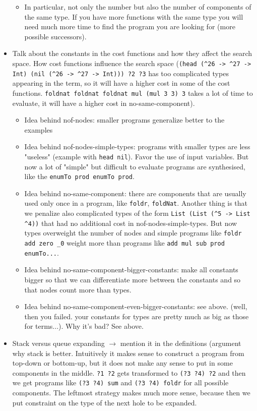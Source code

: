 \begin{itemize}
\begin{itemize}
\item In particular, not only the number but also the number of components of the same type. If you have more functions with the same type you will need much more time to find the program you are looking for (more possible successors).
\end{itemize} 
\item Talk about the constants in the cost functions and how they affect the search space.
How cost functions influence the search space (\lstinline!(head (^26 -> ^27 -> Int) (nil (^26 -> ^27 -> Int))) ?2 ?3! has too complicated types appearing in the term, so it will have a higher cost in some of the cost functions. \lstinline!foldnat foldnat foldnat mul (mul 3 3) 3! takes a lot of time to evaluate, it will have a higher cost in no-same-component).
\begin{itemize}
\item Idea behind nof-nodes: smaller programs generalize better to the examples
\item Idea behind nof-nodes-simple-types: programs with smaller types are less "useless" (example with \lstinline?head nil?). Favor the use of input variables. But now a lot of "simple" but difficult to evaluate programs are synthesised, like the \lstinline?enumTo prod enumTo prod?.
\item Idea behind no-same-component: there are components that are usually used only once in a program, like \lstinline?foldr?, \lstinline?foldNat?. Another thing is that we penalize also complicated types of the form \lstinline?List (List (^5 -> List ^4))? that had no additional cost in nof-nodes-simple-types. But now types overweight the number of nodes and simple programs like \lstinline?foldr add zero _0? weight more than programs like \lstinline?add mul sub prod enumTo...?.
\item Idea behind no-same-component-bigger-constants: make all constants bigger so that we can differentiate more between the constants and so that nodes count more than types.
\item Idea behind no-same-component-even-bigger-constants: see above. (well, then you failed. your constants for types are pretty much as big as those for terms...). Why it's bad? See above.
\end{itemize}
\item Stack versus queue expanding $\rightarrow$ mention it in the definitions (argument why stack is better. Intuitively it makes sense to construct a program from top-down or bottom-up, but it does not make any sense to put in some components in the middle. \lstinline!?1 ?2! gets transformed to \lstinline!(?3 ?4) ?2! and then we get programs like \lstinline!(?3 ?4) sum! and \lstinline!(?3 ?4) foldr! for all possible components. The leftmost strategy makes much more sense, because then we put constraint on the type of the next hole to be expanded.
\end{itemize}

